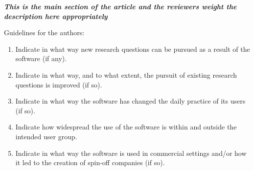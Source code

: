 \documentclass[preprint,12pt, a4paper]{elsarticle}
\begin{document}
{\em \textbf{This is the main section of the article and the reviewers weight
the description here appropriately}

Guidelines for the authors:
\begin{enumerate}
  \item Indicate in what way new research questions can be pursued as a
        result of the software (if any).
  \item Indicate in what way, and to what extent, the pursuit of existing
        research questions is improved (if so).
  \item Indicate in what way the software has changed the daily practice of
        its users (if so).
  \item Indicate how widespread the use of the software is within and outside
        the intended user group.
  \item Indicate in what way the software is used in commercial settings
        and/or how it led to the creation of spin-off companies (if so).
\end{enumerate}}
\end{document}
